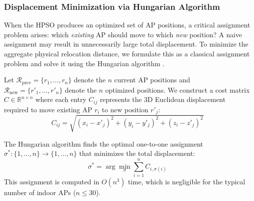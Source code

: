 \documentclass[conference]{IEEEtran}
\begin{document}
\subsubsection{Displacement Minimization via Hungarian Algorithm}

When the HPSO produces an optimized set of AP positions, a critical assignment problem arises: which \textit{existing} AP should move to which \textit{new} position? A naive assignment may result in unnecessarily large total displacement. To minimize the aggregate physical relocation distance, we formulate this as a classical assignment problem and solve it using the Hungarian algorithm \cite{b12}.

Let $\mathcal{R}_{\text{prev}} = \{r_1, \ldots, r_n\}$ denote the $n$ current AP positions and $\mathcal{R}_{\text{new}} = \{r'_1, \ldots, r'_n\}$ denote the $n$ optimized positions. We construct a cost matrix $C \in \mathbb{R}^{n \times n}$ where each entry $C_{ij}$ represents the 3D Euclidean displacement required to move existing AP $r_i$ to new position $r'_j$:
\begin{equation}
    C_{ij} = \sqrt{(x_i - x'_j)^2 + (y_i - y'_j)^2 + (z_i - z'_j)^2}
    \label{eq:cost_matrix}
\end{equation}

The Hungarian algorithm finds the optimal one-to-one assignment $\sigma^*: \{1, \ldots, n\} \to \{1, \ldots, n\}$ that minimizes the total displacement:
\begin{equation}
    \sigma^* = \arg\min_{\sigma} \sum_{i=1}^{n} C_{i, \sigma(i)}
    \label{eq:hungarian}
\end{equation}
This assignment is computed in $O(n^3)$ time, which is negligible for the typical number of indoor APs ($n \le 30$).


\end{document}
